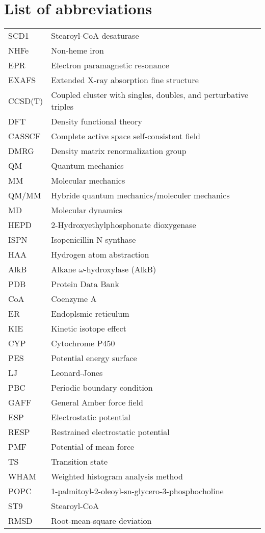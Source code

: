 \chapter*{List of abbreviations}

\begin{table}[htbp]
    \begin{tabular}{ll}
   SCD1 & Stearoyl-CoA desaturase \\
   NHFe & Non-heme iron \\
   EPR & Electron paramagnetic resonance  \\
   EXAFS & Extended X-ray absorption fine structure  \\
   CCSD(T) & Coupled cluster with singles, doubles, and perturbative triples  \\
   DFT & Density functional theory  \\
   CASSCF & Complete active space self-consistent field  \\
   DMRG & Density matrix renormalization group \\
   QM & Quantum mechanics \\
   MM & Molecular mechanics  \\
   QM/MM & Hybride quantum mechanics/moleculer mechanics  \\
   MD & Molecular dynamics  \\
   HEPD & 2-Hydroxyethylphosphonate dioxygenase  \\
   ISPN & Isopenicillin N synthase  \\
   HAA & Hydrogen atom abstraction  \\
   AlkB & Alkane $\omega$-hydroxylase (AlkB) \\
   PDB & Protein Data Bank \\
   CoA & Coenzyme A \\
   ER  & Endoplsmic reticulum \\
   KIE & Kinetic isotope effect \\
   CYP & Cytochrome P450 \\
   PES & Potential energy surface \\
   LJ & Leonard-Jones \\
   PBC & Periodic boundary condition \\
   GAFF & General Amber force field \\
   ESP & Electrostatic potential \\
   RESP & Restrained electrostatic potential \\
   PMF & Potential of mean force \\
   TS & Transition state \\
   WHAM & Weighted histogram analysis method \\
   POPC & 1-palmitoyl-2-oleoyl-sn-glycero-3-phosphocholine \\
   ST9 & Stearoyl-CoA \\
   RMSD & Root-mean-square deviation \\
    \end{tabular}
\end{table}


